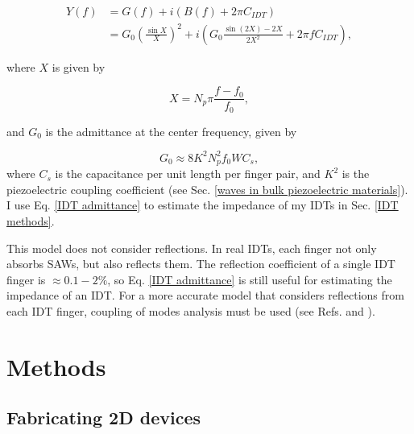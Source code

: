 \documentclass[double,12pt,1in]{beavtex}
\begin{document}
\begin{align}
    Y(f) &= G(f) + i(B(f) + 2\pi C_{IDT})\\
    &= G_0 \left(\frac{\sin X}{X}\right)^2 + i \left(G_0 \frac{\sin (2X) - 2X}{2X^2} + 2\pi f C_{IDT}\right), \label{IDT admittance}
\end{align}

where $X$ is given by

\begin{equation}
    X = N_p \pi \frac{f - f_0}{f_0},
\end{equation}

and $G_0$ is the admittance at the center frequency, given by 

\begin{equation}
    G_0 \approx 8 K^2 N_p^2 f_0 W C_s,
\end{equation}
where $C_s$ is the capacitance per unit length per finger pair, and $K^2$ is the piezoelectric coupling coefficient (see Sec. \ref{waves in bulk piezoelectric materials}). I use Eq. \ref{IDT admittance} to estimate the impedance of my IDTs in Sec. \ref{IDT methods}.

This model does not consider reflections. In real IDTs, each finger not only absorbs SAWs, but also reflects them. The reflection coefficient of a single IDT finger is $\approx 0.1-2\%$, so Eq. \ref{IDT admittance} is still useful for estimating the impedance of an IDT. For a more accurate model that considers reflections from each IDT finger, coupling of modes analysis must be used (see Refs. \cite[p. 140-149]{lane_integrating_2021} and \cite[Ch. 4]{campbell_surface_1989}). 










\chapter{Methods}



\section{Fabricating 2D devices}
\end{document}
